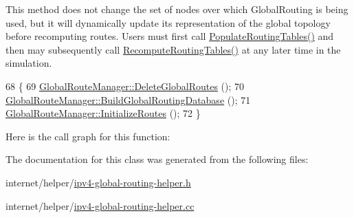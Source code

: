 This method does not change the set of nodes over which Global\+Routing is being used, but it will dynamically update its representation of the global topology before recomputing routes. Users must first call \hyperlink{classns3_1_1Ipv4GlobalRoutingHelper_a540c7339880774ff18a459238ef5a7b2}{Populate\+Routing\+Tables()} and then may subsequently call \hyperlink{classns3_1_1Ipv4GlobalRoutingHelper_a0a266b82c78b1252827f77b22d0637ab}{Recompute\+Routing\+Tables()} at any later time in the simulation. 
\begin{DoxyCode}
68 \{
69   \hyperlink{classns3_1_1GlobalRouteManager_a046807276556c567868fca992895b695}{GlobalRouteManager::DeleteGlobalRoutes} ();
70   \hyperlink{classns3_1_1GlobalRouteManager_af0d9e010837cc915d430b17f63175910}{GlobalRouteManager::BuildGlobalRoutingDatabase} ();
71   \hyperlink{classns3_1_1GlobalRouteManager_aea21f6fb4dbecb0d2e3dadc7db1087d3}{GlobalRouteManager::InitializeRoutes} ();
72 \}
\end{DoxyCode}


Here is the call graph for this function\+:




The documentation for this class was generated from the following files\+:\begin{DoxyCompactItemize}
\item 
internet/helper/\hyperlink{ipv4-global-routing-helper_8h}{ipv4-\/global-\/routing-\/helper.\+h}\item 
internet/helper/\hyperlink{ipv4-global-routing-helper_8cc}{ipv4-\/global-\/routing-\/helper.\+cc}\end{DoxyCompactItemize}
